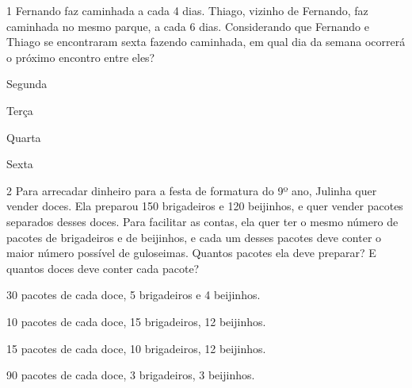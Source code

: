 
\num{1} Fernando faz caminhada a cada 4 dias. Thiago, vizinho de
Fernando, faz caminhada no mesmo parque, a cada 6 dias. Considerando que
Fernando e Thiago se encontraram sexta fazendo caminhada, em qual dia da
semana ocorrerá o próximo encontro entre eles?

\begin{escolha}

\item Segunda

\item Terça

\item Quarta

\item Sexta
\end{escolha}


\num{2} Para arrecadar dinheiro para a festa de formatura do 9º ano,
Julinha quer vender doces. Ela preparou 150 brigadeiros e 120 beijinhos,
e quer vender pacotes separados desses doces. Para facilitar as contas,
ela quer ter o mesmo número de pacotes de brigadeiros e de beijinhos, e
cada um desses pacotes deve conter o maior número possível de guloseimas. 
Quantos pacotes ela deve preparar? E quantos doces deve conter cada 
pacote?   

\begin{escolha}

  \item 30 pacotes de cada doce, 5 brigadeiros e 4 beijinhos.

  \item 10 pacotes de cada doce, 15 brigadeiros, 12 beijinhos.

  \item 15 pacotes de cada doce, 10 brigadeiros, 12 beijinhos.

  \item 90 pacotes de cada doce, 3 brigadeiros, 3 beijinhos.

\end{escolha}

